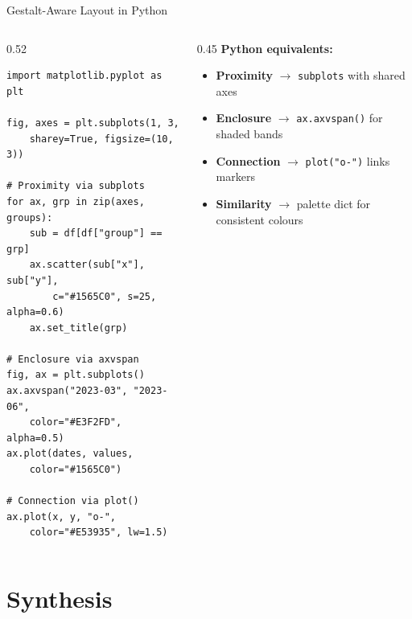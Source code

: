 \documentclass[10pt]{beamer}
\begin{document}
\begin{frame}[fragile]{Gestalt-Aware Layout in Python}
  \begin{columns}[T]
    \begin{column}{0.52\textwidth}
\begin{lstlisting}[style=pythonstyle]
import matplotlib.pyplot as plt

fig, axes = plt.subplots(1, 3,
    sharey=True, figsize=(10, 3))

# Proximity via subplots
for ax, grp in zip(axes, groups):
    sub = df[df["group"] == grp]
    ax.scatter(sub["x"], sub["y"],
        c="#1565C0", s=25, alpha=0.6)
    ax.set_title(grp)

# Enclosure via axvspan
fig, ax = plt.subplots()
ax.axvspan("2023-03", "2023-06",
    color="#E3F2FD", alpha=0.5)
ax.plot(dates, values,
    color="#1565C0")

# Connection via plot()
ax.plot(x, y, "o-",
    color="#E53935", lw=1.5)
\end{lstlisting}
    \end{column}
    \begin{column}{0.45\textwidth}
      \textbf{Python equivalents:}

      \begin{itemize}
        \item \textbf{Proximity} $\rightarrow$ \texttt{subplots}
              with shared axes
        \item \textbf{Enclosure} $\rightarrow$ \texttt{ax.axvspan()}
              for shaded bands
        \item \textbf{Connection} $\rightarrow$ \texttt{plot("o-")}
              links markers
        \item \textbf{Similarity} $\rightarrow$ palette dict
              for consistent colours
      \end{itemize}
    \end{column}
  \end{columns}
\end{frame}

\section{Synthesis}
\end{document}
